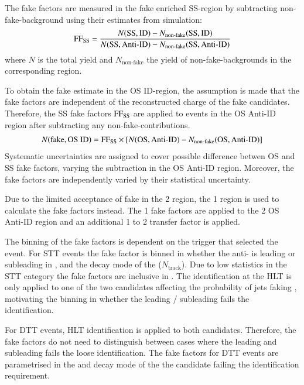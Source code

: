 The fake factors are measured in the fake enriched SS-region by subtracting
non-fake-\tauhadvis background using their estimates from simulation:
\begin{align*}
  \text{FF}_\text{SS} = \frac{N(\text{SS}, \text{ID}) - N_\text{non-fake}(\text{SS}, \text{ID})}{N(\text{SS}, \text{Anti-ID}) - N_\text{non-fake}(\text{SS}, \text{Anti-ID})}
\end{align*}
where $N$ is the total yield and $N_\text{non-fake}$ the yield of
non-fake-\tauhadvis backgrounds in the corresponding region.

To obtain the fake \tauhadvis estimate in the OS ID-region, the assumption is
made that the fake factors are independent of the reconstructed charge of the
fake \tauhadvis candidates. Therefore, the SS fake factors $\text{FF}_\text{SS}$ are
applied to events in the OS Anti-ID region after subtracting any
non-fake-\tauhadvis contributions.
\begin{align*}
  N(\text{fake}, \text{OS ID}) = \text{FF}_\text{SS} \times \left[ N(\text{OS}, \text{Anti-ID}) - N_\text{non-fake}(\text{OS}, \text{Anti-ID}) \right]
\end{align*}
Systematic uncertainties are assigned to
cover possible difference betwen OS and SS fake factors, varying the
subtraction in the OS Anti-ID region. Moreover, the fake factors are
independently varied by their statistical uncertainty.

Due to the limited acceptance of fake \tauhadvis in the 2 \btag region, the 1
\btag region is used to calculate the fake factors instead. The 1 \btag fake
factors are applied to the 2 \btag OS Anti-ID region and an additional 1 to 2
\btag transfer factor is applied.

The binning of the fake factors is dependent on the trigger that selected the
event. For STT events the fake factor is binned in whether the anti-\tauhadvis
is leading or subleading in \pT, and the decay mode of the \tauhadvis
($N_\text{track}$). Due to low statistics in the STT category the fake factors
are inclusive in \tauhadvis \pT. The \tauhadvis identification at the HLT is
only applied to one of the two \tauhadvis candidates affecting the probability
of jets faking \tauhadvis, motivating the binning in whether the leading /
subleading \tauhadvis fails the identification.

For DTT events, HLT \tauhadvis identification is applied to both \tauhadvis
candidates. Therefore, the fake factors do not need to distinguish between cases
where the leading and subleading \tauhadvis fails the loose identification. The
fake factors for DTT events are parametrised in the \pT and decay mode of the
the \tauhadvis candidate failing the identification requirement.

